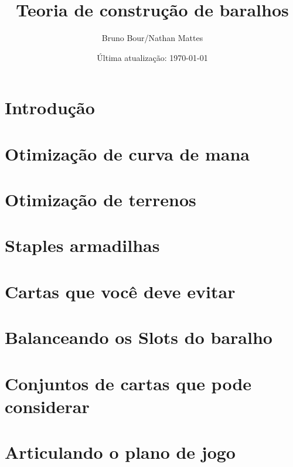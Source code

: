 \documentclass[12pt, a4paper]{article}
\begin{document}
\bgroup\obeylines

\title{Teoria de construção de baralhos}
\author{Bruno Bour/Nathan Mattes}
\date{Última atualização: \today}
    \maketitle

    \tableofcontents
    

    \pagebreak

    
    \section{Introdução}
     \pagebreak

    \section{Otimização de curva de mana}
     \pagebreak
    
    \section{Otimização de terrenos}
     \pagebreak

    \section{Staples armadilhas}
     \pagebreak

    \section{Cartas que você deve evitar}
     \pagebreak

    \section{Balanceando os Slots do baralho}
     \pagebreak

    \section{Conjuntos de cartas que pode considerar}
     \pagebreak

    \section{Articulando o plano de jogo}
     \pagebreak
\end{document}
